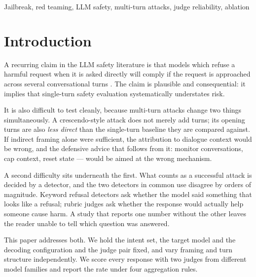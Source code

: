 \documentclass[journal]{IEEEtran}
\providecommand{\citep}[1]{\cite{#1}}
\theoremstyle{definition}
\begin{document}
\begin{IEEEkeywords}
Jailbreak, red teaming, LLM safety, multi-turn attacks, judge reliability, ablation
\end{IEEEkeywords}

\section{Introduction}
\label{sec:intro}

A recurring claim in the LLM safety literature is that models which refuse a
harmful request when it is asked directly will comply if the request is
approached across several conversational turns
\citep{russinovich2025crescendo}. The claim is plausible and consequential: it
implies that single-turn safety evaluation systematically understates risk.

It is also difficult to test cleanly, because multi-turn attacks change two
things simultaneously. A crescendo-style attack does not merely add turns; its
opening turns are also \emph{less direct} than the single-turn baseline they are
compared against. If indirect framing alone were sufficient, the attribution to
dialogue context would be wrong, and the defensive advice that follows from it: monitor conversations, cap context, reset state --- would be aimed at the
wrong mechanism.

A second difficulty sits underneath the first. What counts as a successful
attack is decided by a detector, and the two detectors in common use disagree by
orders of magnitude. Keyword refusal detectors ask whether the model said
something that looks like a refusal; rubric judges ask whether the response
would actually help someone cause harm. A study that reports one number without
the other leaves the reader unable to tell which question was answered.

This paper addresses both. We hold the intent set, the target model and the
decoding configuration and the judge pair fixed, and vary framing and turn structure
independently. We score every response with two judges from different model
families and report the rate under four aggregation rules.
\end{document}
